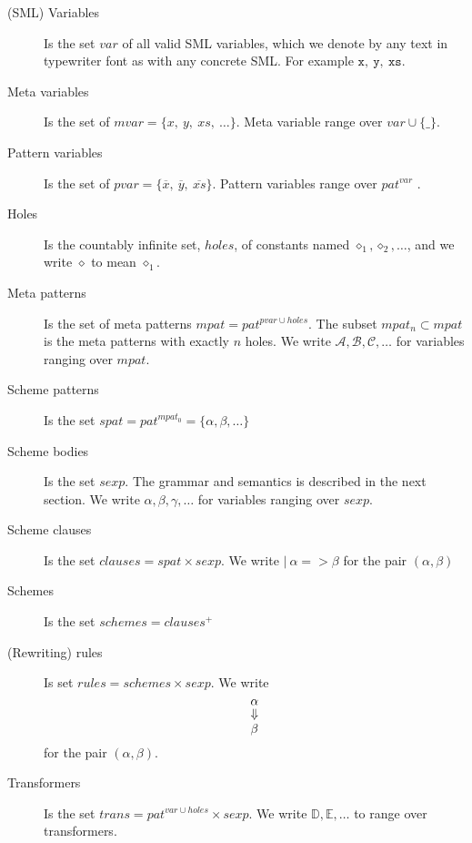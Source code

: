 \begin{description}
\item[(SML) Variables] Is the set $var$ of all valid SML variables, which we
  denote by any text in typewriter font as with any concrete SML. For example
  $\mathtt{x},\ \mathtt{y},\ \mathtt{xs}$.



\item[Meta variables] Is the set of $mvar = \{x,\ y,\ xs,\ \ldots \}$. Meta
  variable range over $var \cup \{\texttt{_}\}$.


\item[Pattern variables] Is the set of $pvar = \{ \overline{x},\ \overline{y},\
  \overline{xs} \}$. Pattern variables range over $pat^{var}$ .


\item[Holes] Is the countably infinite set, $holes$, of constants named
  $\diamond_1, \diamond_2, \ldots$, and we write $\diamond$ to mean
  $\diamond_1$.


\item[Meta patterns] Is the set of meta patterns $mpat = pat^{pvar \cup
    holes}$. The subset $mpat_n \subset mpat$ is the meta patterns with exactly
  $n$ holes. We write $\mathcal{A},\mathcal{B}, \mathcal{C}, \ldots$ for
  variables ranging over $mpat$.


\item[Scheme patterns] Is the set $spat = pat^{mpat_0} = \{\alpha, \beta, \ldots
  \}$


\item[Scheme bodies] Is the set $sexp$. The grammar and semantics is described
  in the next section. We write $\alpha, \beta, \gamma, \ldots$ for variables
  ranging over $sexp$.


\item[Scheme clauses] Is the set $clauses = spat \times sexp$. We write $|\
  \alpha => \beta$ for the pair $(\alpha, \beta)$


\item[Schemes] Is the set $schemes = clauses^{+}$


\item[(Rewriting) rules] Is set $rules = schemes \times sexp$. We write
  \[
  \shortstack[ccc]{$\alpha$ \\ $\Downarrow$ \\ $\beta$}
  \]
  for the pair $(\alpha, \beta)$.


\item[Transformers] Is the set $trans = pat^{var \cup holes} \times sexp$. We
  write $\mathbb{D}, \mathbb{E}, \ldots$ to range over transformers.

\end{description}


